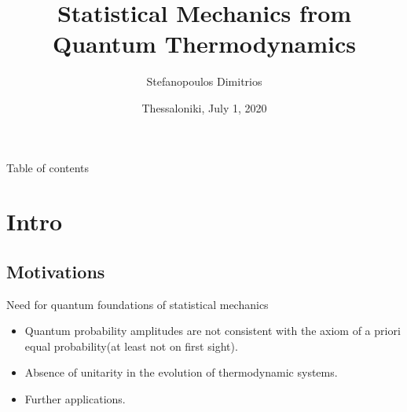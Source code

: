 \documentclass[handout]{beamer}
\begin{document}
\author[Stefanopoulos]{Stefanopoulos Dimitrios}
\title[Quantum Thermodynamics]{Statistical Mechanics from Quantum Thermodynamics}
\date{Thessaloniki, July 1, 2020}
\frame{\titlepage}


\begin{frame}{Table of contents}
\tableofcontents
\end{frame}


\section{Intro}
\subsection{Motivations}
\begin{frame}{Need for quantum foundations of statistical mechanics}
\begin{itemize}
\item Quantum probability amplitudes are not consistent with the axiom of a priori equal probability(at least not on first sight).
\item Absence of unitarity in the evolution of thermodynamic systems.
\item Further applications.
\end{itemize}
\end{frame}
\end{document}
